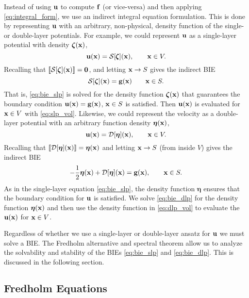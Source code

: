 Instead of using ${\mathbf{u}}$ to compute ${\mathbf{f}}$ (or vice-versa) and then applying \eqref{eq:integral_form}, we use an indirect integral equation formulation. This is done by representing ${\mathbf{u}}$ with an arbitrary, non-physical, density function of the single- or double-layer potentials. For example, we could represent ${\mathbf{u}}$ as a single-layer potential with density $\bm{\zeta}({\mathbf{x}})$, 
\begin{equation}\label{eq:slp_vol}{\mathbf{u}}({\mathbf{x}}) = \mathcal{S}[\pmb{\zeta}]({\mathbf{x}}), \qquad {\mathbf{x}} \in V.\end{equation}
Recalling that $\llbracket\mathcal{S}[\bm{\zeta}]({\mathbf{x}})\rrbracket= \mathbf{0}$, and letting ${\mathbf{x}} \to S$ gives the indirect BIE
\begin{equation}\label{eq:bie_slp}\mathcal{S}[\bm{\zeta}]({\mathbf{x}}) = \mathbf{g}({\mathbf{x}}) \qquad {\mathbf{x}}\in S.\end{equation}
That is, \eqref{eq:bie_slp} is solved for the density function $\bm{\zeta}({\mathbf{x}})$ that guarantees the boundary condition ${\mathbf{u}}({\mathbf{x}}) = \mathbf{g}({\mathbf{x}})$, ${\mathbf{x}}\in S$ is satisfied. Then ${\mathbf{u}}({\mathbf{x}})$ is evaluated for ${\mathbf{x}}\in V$ with \eqref{eq:slp_vol}. Likewise, we could represent the velocity as a double-layer potential with an arbitrary function density $\bm{\eta}({\mathbf{x}})$,
\begin{equation}\label{eq:dlp_vol}{\mathbf{u}}({\mathbf{x}}) = \mathcal{D}[\bm{\eta}]({\mathbf{x}}), \qquad {\mathbf{x}}\in V.\end{equation}
Recalling that $\llbracket\mathcal{D}[\bm{\eta}]({\mathbf{x}})\rrbracket = \bm{\eta}({\mathbf{x}})$ and letting ${\mathbf{x}} \to S$ (from inside $V$) gives the indirect BIE
\begin{equation}\label{eq:bie_dlp} -\frac{1}{2}\bm{\eta}({\mathbf{x}}) + \mathcal{D}[\bm{\eta}]({\mathbf{x}}) = \mathbf{g}({\mathbf{x}}), \qquad {\mathbf{x}}\in S.\end{equation}
As in the single-layer equation \eqref{eq:bie_slp}, the density function $\bm{\eta}$ ensures that the boundary condition for ${\mathbf{u}}$ is satisfied. We solve \eqref{eq:bie_dlp} for the density function $\bm{\eta}({\mathbf{x}})$  and then use the density function in \eqref{eq:dlp_vol} to evaluate the ${\mathbf{u}}({\mathbf{x}})$ for ${\mathbf{x}}\in V$. 

Regardless of whether we use a single-layer or double-layer ansatz for ${\mathbf{u}}$ we must solve a BIE. The Fredholm alternative and spectral theorem allow us to analyze the solvability and stability of the BIEs \eqref{eq:bie_slp} and \eqref{eq:bie_dlp}. This is discussed in the following section.

\subsection{Fredholm Equations}\label{sec:fredholm}

